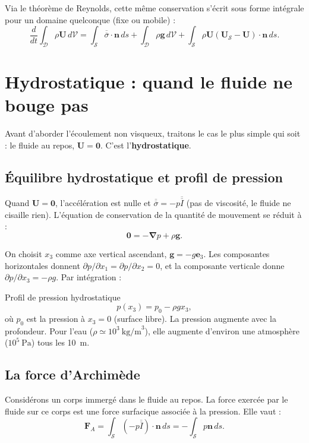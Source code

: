 \documentclass[11pt,a4paper]{report}
\newcommand{\ten}[1]{\overline{\overline{#1}}}   %
\begin{document}
Via le théorème de Reynolds, cette même conservation s'écrit sous forme intégrale
pour un domaine quelconque (fixe ou mobile) :
\[
    \frac{d}{dt}\int_{\mathcal{D}} \rho\bm{U}\,d\mathcal{V}
    = \int_{\mathcal{S}} \ten{\sigma}\cdot\bm{n}\,ds
    + \int_{\mathcal{D}} \rho\bm{g}\,d\mathcal{V}
    + \int_{\mathcal{S}} \rho\bm{U}(\bm{U}_\mathcal{S}-\bm{U})\cdot\bm{n}\,ds.
\]

\section{Hydrostatique : quand le fluide ne bouge pas}

Avant d'aborder l'écoulement non visqueux, traitons le cas le plus simple qui soit :
le fluide au repos, $\bm{U} = \bm{0}$. C'est l'\textbf{hydrostatique}.

\subsection{Équilibre hydrostatique et profil de pression}

Quand $\bm{U} = \bm{0}$, l'accélération est nulle et $\ten{\sigma} = -p\ten{I}$
(pas de viscosité, le fluide ne cisaille rien). L'équation de conservation de
la quantité de mouvement se réduit à :
\[
    \bm{0} = -\boldsymbol{\nabla}p + \rho\bm{g}.
\]

On choisit $x_3$ comme axe vertical ascendant, $\bm{g} = -g\bm{e}_3$. Les
composantes horizontales donnent $\partial p/\partial x_1 = \partial p/\partial x_2 = 0$,
et la composante verticale donne $\partial p/\partial x_3 = -\rho g$. Par intégration :

\begin{importantbox}{Profil de pression hydrostatique}
\[
    p(x_3) = p_0 - \rho g x_3,
\]
où $p_0$ est la pression à $x_3 = 0$ (surface libre). La pression augmente avec
la profondeur. Pour l'eau ($\rho \simeq 10^3~\text{kg/m}^3$), elle augmente d'environ
une atmosphère ($10^5~\text{Pa}$) tous les 10~m.
\end{importantbox}

\subsection{La force d'Archimède}

Considérons un corps immergé dans le fluide au repos. La force exercée par le fluide
sur ce corps est une force surfacique associée à la pression. Elle vaut :
\[
    \bm{F}_A = \int_\mathcal{S} (-p\ten{I})\cdot\bm{n}\,ds
             = -\int_\mathcal{S} p\bm{n}\,ds.
\]
\end{document}
